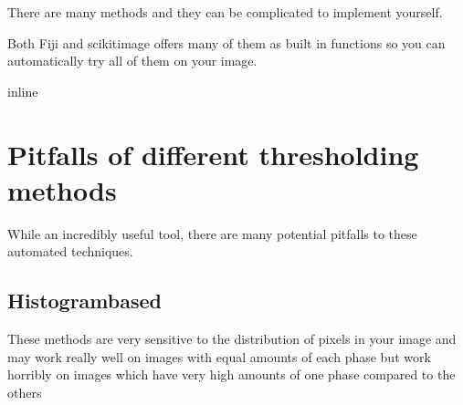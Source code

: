 \documentclass[letterpaper,10pt,english]{sphinxmanual}
\begin{document}
\sphinxAtStartPar
There are many methods and they can be complicated to implement yourself.

\sphinxAtStartPar
Both Fiji and scikit\sphinxhyphen{}image offers many of them as built in functions so you can automatically try all of them on your image.

\begin{sphinxVerbatim}[commandchars=\\\{\}]
 inline
   
   
   
\end{sphinxVerbatim}

\begin{sphinxVerbatim}[commandchars=\\\{\}]
  

   

      
\end{sphinxVerbatim}

\noindent{}


\section{Pitfalls of different thresholding methods}
\label{\detokenize{05-AdvancedSegmentation:pitfalls-of-different-thresholding-methods}}
\sphinxAtStartPar
While an incredibly useful tool, there are many potential pitfalls to these automated techniques.


\subsection{Histogram\sphinxhyphen{}based}
\label{\detokenize{05-AdvancedSegmentation:histogram-based}}
\sphinxAtStartPar
These methods are very sensitive to the distribution of pixels in your image and may work really well on images with equal amounts of each phase but work horribly on images which have very high amounts of one phase compared to the others
\end{document}
